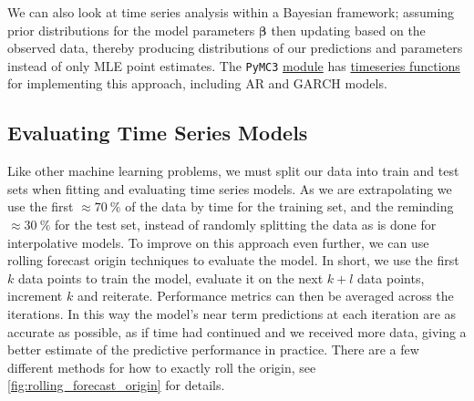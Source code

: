 We can also look at time series analysis within a Bayesian framework;
assuming prior distributions for the model parameters $\bm{\beta}$
then updating based on the observed data,
thereby producing distributions of our predictions and parameters instead of only MLE point estimates.
The \texttt{PyMC3} \href{https://docs.pymc.io/en/v3/}{module}
has \href{https://docs.pymc.io/en/v3/api/distributions/timeseries.html}{timeseries functions}
for implementing this approach, including AR and GARCH models.

\subsection{Evaluating Time Series Models}
\label{additional:time_series:eval}

Like other machine learning problems, we must split our data into train and test sets
when fitting and evaluating time series models.
As we are extrapolating we use the first
$\approx \SI{70}{\percent}$ of the data by time for the training set,
and the reminding $\approx \SI{30}{\percent}$ for the test set,
instead of randomly splitting the data as is done for interpolative models.
To improve on this approach even further, we can use
rolling forecast origin techniques to evaluate the model.
In short, we use the first $k$ data points to train the model,
evaluate it on the next $k + l$ data points, increment $k$ and reiterate.
Performance metrics can then be averaged across the iterations.
In this way the model's near term predictions at each iteration are as accurate as possible,
as if time had continued and we received more data,
giving a better estimate of the predictive performance in practice.
There are a few different methods for how to exactly roll the origin,
see \cref{fig:rolling_forecast_origin} for details.

